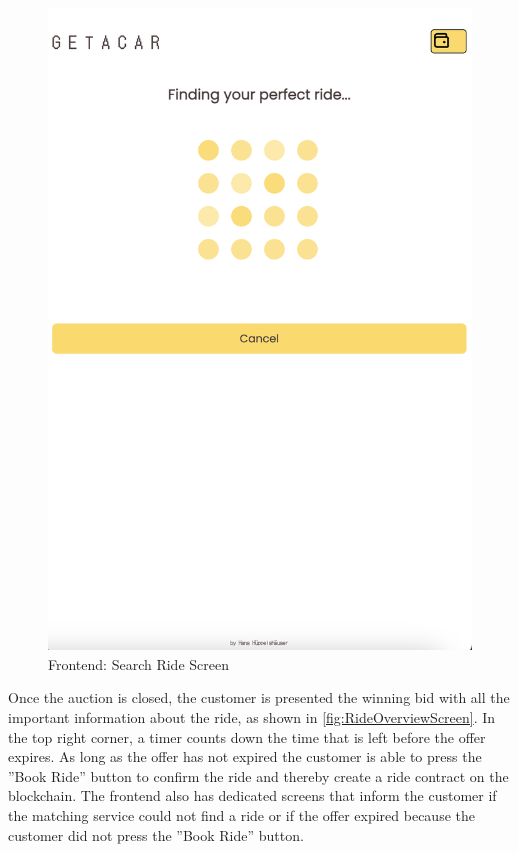 \begin{figure}[H]
\begin{minipage}{0.45\linewidth}
        \includegraphics[width=\linewidth]{data/ffss/4.png}
        \caption{Frontend: Search Ride Screen}
        \label{fig:SearchRideScreen}
    \end{minipage}
    
\end{figure}

Once the auction is closed, the customer is presented the winning bid with all the important information about the ride, as shown in \ref{fig:RideOverviewScreen}. In the top right corner, a timer counts down the time that is left before the offer expires. As long as the offer has not expired the customer is able to press the ''Book Ride'' button to confirm the ride and thereby create a ride contract on the blockchain. The frontend also has dedicated screens that inform the customer if the matching service could not find a ride or if the offer expired because the customer did not press the ''Book Ride'' button.

